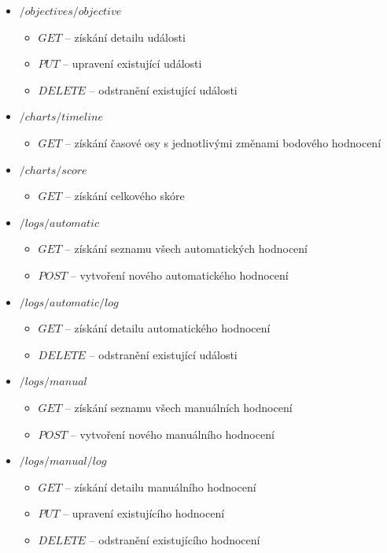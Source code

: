 \documentclass[
  digital, %
  twoside, %
  table,   %
  lof,     %
  lot,     %
]{fithesis3}
\begin{document}
\begin{itemize}
    \item $/objectives/{objective}$
    \begin{itemize}
        \item $GET$ -- získání detailu události
        \item $PUT$ -- upravení existující události
        \item $DELETE$ -- odstranění existující události
    \end{itemize}
        
    \item $/charts/timeline$
    \begin{itemize}
        \item $GET$ -- získání časové osy s jednotlivými změnami bodového hodnocení
    \end{itemize}
        
    \item $/charts/score$
    \begin{itemize}
        \item $GET$ -- získání celkového skóre
    \end{itemize}
        
    \item $/logs/automatic$
    \begin{itemize}
        \item $GET$ -- získání seznamu všech automatických hodnocení
        \item $POST$ --  vytvoření nového automatického hodnocení
    \end{itemize}
        
    \item $/logs/automatic/{log}$
    \begin{itemize}
        \item $GET$ -- získání detailu automatického hodnocení
        \item $DELETE$ -- odstranění existující události
    \end{itemize}
            
    \item $/logs/manual$
    \begin{itemize}
        \item $GET$ -- získání seznamu všech manuálních hodnocení
        \item $POST$ --  vytvoření nového manuálního hodnocení
    \end{itemize}
            
    \item $/logs/manual/{log}$
    \begin{itemize}
        \item $GET$ -- získání detailu manuálního hodnocení
        \item $PUT$ -- upravení existujícího hodnocení
        \item $DELETE$ -- odstranění existujícího hodnocení
    \end{itemize}
            

\end{itemize}
\end{document}
